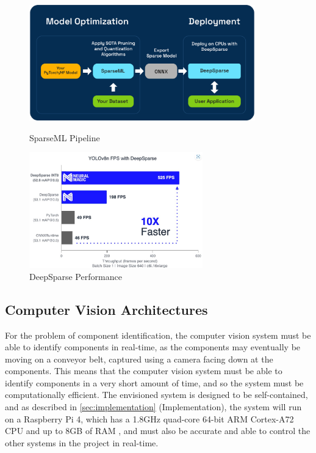 \begin{figure}[H]
  \begin{minipage}[t]{0.49\textwidth}
    \centering
    \includegraphics[width=\textwidth,height=5cm]{imgs/articles/sparseml-workflow.png}
    \caption{SparseML Pipeline \cite{sparseml}}
  \end{minipage}
  \hfill
  \begin{minipage}[t]{0.49\textwidth}
      \centering
      \includegraphics[width=\textwidth,height=5cm]{imgs/articles/yoloperf.jpg}
      \caption{DeepSparse Performance \cite{neuralmagic}}
      \end{minipage}
\end{figure}

\subsection{Computer Vision Architectures}
For the problem of component identification, the computer vision system must be able to identify components in real-time, as the components may eventually be moving on a conveyor belt, captured using a camera facing down at the components. This means that the computer vision system must be able to identify components in a very short amount of time, and so the system must be computationally efficient. The envisioned system is designed to be self-contained, and as described in \autoref{sec:implementation} (Implementation), the system will run on a Raspberry Pi 4, which has a 1.8GHz quad-core 64-bit ARM Cortex-A72 CPU and up to 8GB of RAM \cite{pi4}, and must also be accurate and able to control the other systems in the project in real-time.

